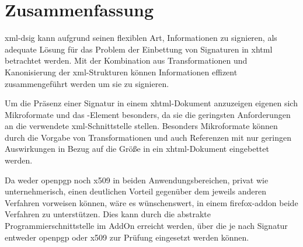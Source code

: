 
\chapter{Zusammenfassung}
\label{chap:Zusammenfassung}
\gls{xml-dsig} kann aufgrund seinen flexiblen Art, Informationen zu signieren, als adequate Lösung für das Problem der Einbettung von Signaturen in \gls{xhtml}
betrachtet werden. Mit der Kombination aus Transformationen und Kanonisierung der \gls{xml}-Strukturen können Informationen effizent zusammengeführt werden um
sie zu signieren.

Um die Präsenz einer Signatur in einem \gls{xhtml}-Dokument anzuzeigen eigenen sich Mikroformate und das -Element besonders, da sie die geringsten 
Anforderungen an die verwendete \gls{xml}-Schnittstelle stellen. Besonders Mikroformate können durch die Vorgabe von Transformationen und auch Referenzen mit 
nur geringen Auswirkungen in Bezug auf die Größe in ein \gls{xhtml}-Dokument eingebettet werden.

Da weder \gls{openpgp} noch \gls{x509} in beiden Anwendungsbereichen, privat wie unternehmerisch, einen deutlichen Vorteil gegenüber dem jeweils anderen
Verfahren vorweisen können, wäre es wünschenswert, in einem \gls{firefox-addon} beide Verfahren zu unterstützen. Dies kann durch die abstrakte
Programmierschnittstelle im AddOn erreicht werden, über die je nach Signatur entweder \gls{openpgp} oder \gls{x509} zur Prüfung eingesetzt werden können.

